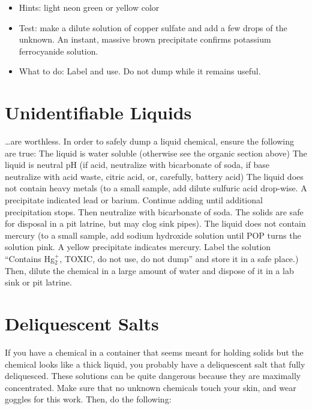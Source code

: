 \begin{itemize}

\item{Hints: light neon green or yellow color}

\item{Test: make a dilute solution of copper sulfate and add a few drops of the unknown. 
An instant, 
massive brown precipitate confirms potassium ferrocyanide solution.}

\item{What to do: Label and use. 
Do not dump while it remains useful.}

\end{itemize}

\section{Unidentifiable Liquids}

…are worthless. 
In order to safely dump a liquid chemical, 
ensure the following are true:
The liquid is water soluble (otherwise see the organic section above)
The liquid is neutral pH (if acid, 
neutralize with bicarbonate of soda, 
if base neutralize with acid waste, 
citric acid, 
or, 
carefully, 
battery acid)
The liquid does not contain heavy metals (to a small sample, 
add dilute sulfuric acid drop-wise. 
A precipitate indicated lead or barium. 
Continue adding until additional precipitation stops. 
Then neutralize with bicarbonate of soda. 
The solids are safe for disposal in a pit latrine, 
but may clog sink pipes).
The liquid does not contain mercury (to a small sample, 
add sodium hydroxide solution until POP turns the solution pink. 
A yellow precipitate indicates mercury. 
Label the solution ``Contains Hg$_{2}^{+}$, 
TOXIC, 
do not use, 
do not dump'' and store it in a safe place.)
Then, 
dilute the chemical in a large amount of water 
and dispose of it in a lab sink or pit latrine.

\section{Deliquescent Salts}

If you have a chemical in a container that seems meant 
for holding solids but the chemical looks like a thick liquid, 
you probably have a deliquescent salt that fully deliquesced. 
These solutions can be quite dangerous 
because they are maximally concentrated. 
Make sure that no unknown chemicals touch your skin, 
and wear goggles for this work. 
Then, 
do the following:

